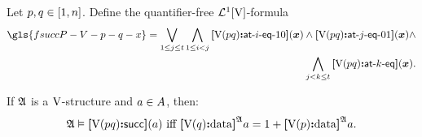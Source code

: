 \begin{definition}
Let $p, q \in [1, n]$. Define the quantifier-free $\mathcal{L}^{1}[\mathrm{V}]$-formula
\begin{align*}
  \gls{fsuccP-V-p-q-x} =
  \bigvee_{1 \leq \jj \leq \tbit} \bigwedge_{1 \leq \ii < \jj}
  \feqPPIO\VS\posp\posq\ii(\xx) \land
  \feqPPOI\VS\posp\posq\jj(\xx) \land \\
  \bigwedge_{\jj < \kk \leq \tbit}
  \feqPP\VS\posp\posq\kk(\xx).
\end{align*}
\end{definition}
If $\mathfrak{A}$ is a $\mathrm{V}$-structure and $a \in A$,
then:
\[
  \miff{
  \StrA \vDash \fsuccP\VS\posp\posq(\ea)}{
  \data{\VSp\posq}\StrA\ea = 1 + \data{\VSp\posp}\StrA\ea}.
\]